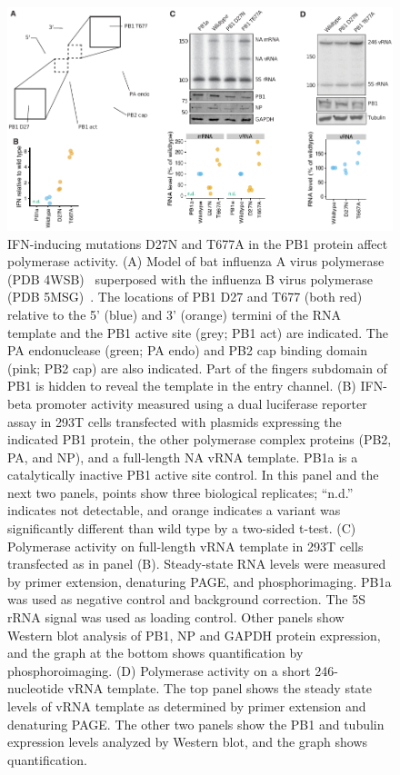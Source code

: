 \documentclass[lineno]{asm-article}
\begin{document}
\begin{figure}

\centerline{\includegraphics[width=\textwidth]{figures/PB1_figure/PB1_figure.pdf}}
\caption{
IFN-inducing mutations D27N and T677A in the PB1 protein affect polymerase activity. 
(A) Model of bat influenza A virus polymerase (PDB 4WSB)~\cite{reich2014structural} superposed with the influenza B virus polymerase (PDB 5MSG)~\cite{reich2017vitro}.
The locations of PB1 D27 and T677 (both red) relative to the 5' (blue) and 3' (orange) termini of the RNA template and the PB1 active site (grey; PB1 act) are indicated.
The PA endonuclease (green; PA endo) and PB2 cap binding domain (pink; PB2 cap) are also indicated. 
Part of the fingers subdomain of PB1 is hidden to reveal the template in the entry channel. 
(B) IFN-beta promoter activity measured using a dual luciferase reporter assay in 293T cells transfected with plasmids expressing the indicated PB1 protein, the other polymerase complex proteins (PB2, PA, and NP), and a full-length NA vRNA template.
PB1a is a catalytically inactive PB1 active site control.
In this panel and the next two panels, points show three biological replicates; ``n.d.'' indicates not detectable, and orange indicates a variant was significantly different than wild type by a two-sided t-test.
(C) Polymerase activity on full-length vRNA template in 293T cells transfected as in panel (B).
Steady-state RNA levels were measured by primer extension, denaturing PAGE, and phosphorimaging. 
PB1a was used as negative control and background correction. 
The 5S rRNA signal was used as loading control. 
Other panels show Western blot analysis of PB1, NP and GAPDH protein expression, and the graph at the bottom shows quantification by phosphoroimaging. 
(D) Polymerase activity on a short 246-nucleotide vRNA template. 
The top panel shows the steady state levels of vRNA template as determined by primer extension and denaturing PAGE. 
The other two panels show the PB1 and tubulin expression levels analyzed by Western blot, and the graph shows quantification.
}
\label{fig:PB1}

\end{figure}
\end{document}
